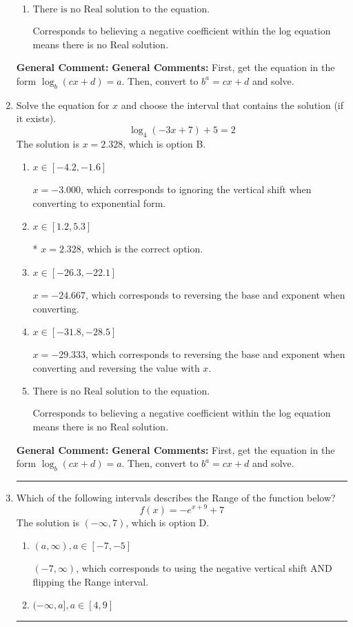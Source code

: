 \documentclass{extbook}[14pt]
\newcommand{\litem}[1]{\item #1

\rule{\textwidth}{0.4pt}}
\begin{document}
\begin{enumerate}
{\begin{enumerate}[label=\Alph*.]
$x = 119.000$, which corresponds to reversing the base and exponent when converting and reversing the value with $x$.
\item \( \text{There is no Real solution to the equation.} \)

Corresponds to believing a negative coefficient within the log equation means there is no Real solution.
\end{enumerate}

\textbf{General Comment:} \textbf{General Comments:} First, get the equation in the form $\log_b{(cx+d)} = a$. Then, convert to $b^a = cx+d$ and solve.
}
\litem{
Solve the equation for $x$ and choose the interval that contains the solution (if it exists).
\[ \log_{4}{(-3x+7)}+5 = 2 \]The solution is \( x = 2.328 \), which is option B.\begin{enumerate}[label=\Alph*.]
\item \( x \in [-4.2, -1.6] \)

$x = -3.000$, which corresponds to ignoring the vertical shift when converting to exponential form.
\item \( x \in [1.2, 5.3] \)

* $x = 2.328$, which is the correct option.
\item \( x \in [-26.3, -22.1] \)

$x = -24.667$, which corresponds to reversing the base and exponent when converting.
\item \( x \in [-31.8, -28.5] \)

$x = -29.333$, which corresponds to reversing the base and exponent when converting and reversing the value with $x$.
\item \( \text{There is no Real solution to the equation.} \)

Corresponds to believing a negative coefficient within the log equation means there is no Real solution.
\end{enumerate}

\textbf{General Comment:} \textbf{General Comments:} First, get the equation in the form $\log_b{(cx+d)} = a$. Then, convert to $b^a = cx+d$ and solve.
}
\litem{
Which of the following intervals describes the Range of the function below?
\[ f(x) = -e^{x+9}+7 \]The solution is \( (-\infty, 7) \), which is option D.\begin{enumerate}[label=\Alph*.]
\item \( (a, \infty), a \in [-7, -5] \)

$(-7, \infty)$, which corresponds to using the negative vertical shift AND flipping the Range interval.
\item \( (-\infty, a], a \in [4, 9] \)


\end{enumerate}}
\end{enumerate}
\end{document}
